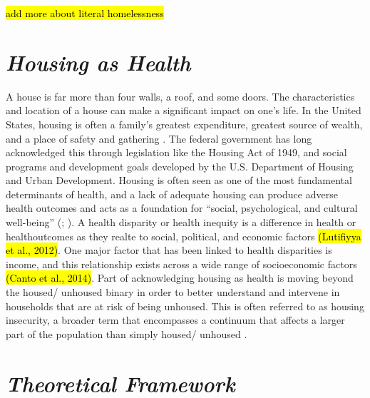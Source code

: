 \hl{add more about literal homelessness}

\section{\textit{Housing as Health}}
A house is far more than four walls, a roof, and some doors. The characteristics and location of a house can make a significant impact on one’s life. In the United States, housing is often a family’s greatest expenditure, greatest source of wealth, and a place of safety and gathering \citep{braveman_housing_2011}. The federal government has long acknowledged this through legislation like the Housing Act of 1949, and social programs and development goals developed by the U.S. Department of Housing and Urban Development. Housing is often seen as one of the most fundamental determinants of health, and a lack of adequate housing can produce adverse health outcomes and acts as a foundation for “social, psychological, and cultural well-being” (\citealp[p.17]{dalessandro_housing_2020}; \citealp{leifheit_building_2022}).  A health disparity or health inequity is a difference in health or healthoutcomes as they realte to social, political, and economic factors \hl{(Lutifiyya et al., 2012)}. %
One major factor that has been linked to health disparities is income, and this relationship exists across a wide range of socioeconomic factors \hl{(Canto et al., 2014)}.  Part of acknowledging housing as health is moving beyond the housed/ unhoused binary in order to better understand and intervene in households that are at risk of being unhoused. This is often referred to as housing insecurity, a broader term that encompasses a continuum that affects a larger part of the population than simply housed/ unhoused \citep{deluca_housing_2022}.

\section{\textit{Theoretical Framework}}


